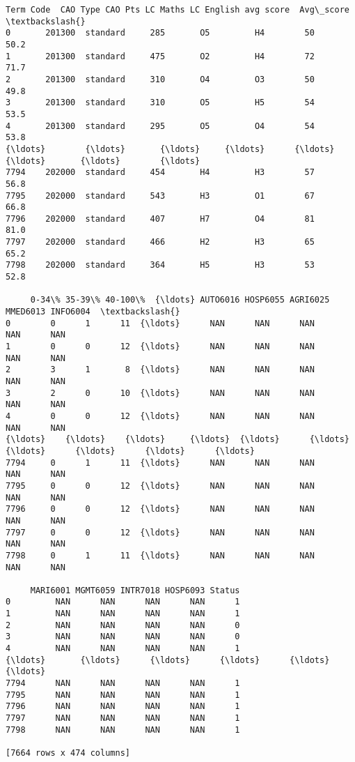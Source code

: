 \documentclass[11pt]{article}
\makeatletter
\newcommand{\boxspacing}{\kern\kvtcb@left@rule\kern\kvtcb@boxsep}
\newcommand{\prompt}[4]{
        \ttfamily\llap{{\color{#2}[#3]:\hspace{3pt}#4}}\vspace{-\baselineskip}
    }
\makeatother
\begin{document}
            \begin{tcolorbox}[breakable, size=fbox, boxrule=.5pt, pad at break*=1mm, opacityfill=0]
\prompt{Out}{outcolor}{20}{\boxspacing}
\begin{Verbatim}[commandchars=\\\{\}]
     Term Code  CAO Type CAO Pts LC Maths LC English avg score  Avg\_score  \textbackslash{}
0       201300  standard     285       O5         H4        50       50.2
1       201300  standard     475       O2         H4        72       71.7
2       201300  standard     310       O4         O3        50       49.8
3       201300  standard     310       O5         H5        54       53.5
4       201300  standard     295       O5         O4        54       53.8
{\ldots}        {\ldots}       {\ldots}     {\ldots}      {\ldots}        {\ldots}       {\ldots}        {\ldots}
7794    202000  standard     454       H4         H3        57       56.8
7795    202000  standard     543       H3         O1        67       66.8
7796    202000  standard     407       H7         O4        81       81.0
7797    202000  standard     466       H2         H3        65       65.2
7798    202000  standard     364       H5         H3        53       52.8

     0-34\% 35-39\% 40-100\%  {\ldots} AUTO6016 HOSP6055 AGRI6025 MMED6013 INFO6004  \textbackslash{}
0        0      1      11  {\ldots}      NAN      NAN      NAN      NAN      NAN
1        0      0      12  {\ldots}      NAN      NAN      NAN      NAN      NAN
2        3      1       8  {\ldots}      NAN      NAN      NAN      NAN      NAN
3        2      0      10  {\ldots}      NAN      NAN      NAN      NAN      NAN
4        0      0      12  {\ldots}      NAN      NAN      NAN      NAN      NAN
{\ldots}    {\ldots}    {\ldots}     {\ldots}  {\ldots}      {\ldots}      {\ldots}      {\ldots}      {\ldots}      {\ldots}
7794     0      1      11  {\ldots}      NAN      NAN      NAN      NAN      NAN
7795     0      0      12  {\ldots}      NAN      NAN      NAN      NAN      NAN
7796     0      0      12  {\ldots}      NAN      NAN      NAN      NAN      NAN
7797     0      0      12  {\ldots}      NAN      NAN      NAN      NAN      NAN
7798     0      1      11  {\ldots}      NAN      NAN      NAN      NAN      NAN

     MARI6001 MGMT6059 INTR7018 HOSP6093 Status
0         NAN      NAN      NAN      NAN      1
1         NAN      NAN      NAN      NAN      1
2         NAN      NAN      NAN      NAN      0
3         NAN      NAN      NAN      NAN      0
4         NAN      NAN      NAN      NAN      1
{\ldots}       {\ldots}      {\ldots}      {\ldots}      {\ldots}    {\ldots}
7794      NAN      NAN      NAN      NAN      1
7795      NAN      NAN      NAN      NAN      1
7796      NAN      NAN      NAN      NAN      1
7797      NAN      NAN      NAN      NAN      1
7798      NAN      NAN      NAN      NAN      1

[7664 rows x 474 columns]
\end{Verbatim}
\end{tcolorbox}
        
\end{document}
